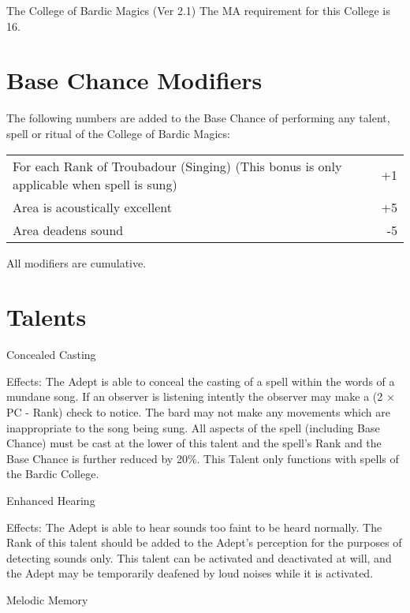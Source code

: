 \begin{Chapter}{The College of Bardic Magics (Ver 2.1)}
The MA requirement for this College is 16. 

\section{Base Chance Modifiers}

The following numbers are added to the Base Chance of performing any
talent, spell or ritual of the College of Bardic Magics:

\begin{tabularx}{\columnwidth}{Xr}
For each Rank of Troubadour (Singing) (This bonus is only applicable when spell is sung)	& +1 \\
Area is acoustically excellent	& +5 \\
Area deadens sound		& -5 \\
\end{tabularx}

All modifiers are cumulative. 

\section{Talents}

\begin{talent}[T-1]{Concealed Casting }

Effects:
The Adept is able to conceal the casting of a spell within the words
of a mundane song.  If an observer is listening intently the observer
may make a (2 × PC - Rank) check to notice. The bard may not make any
movements which are inappropriate to the song being sung.  All aspects
of the spell (including Base Chance) must be cast at the lower of this
talent and the spell’s Rank and the Base Chance is further reduced by
20\%. This Talent only functions with spells of the Bardic College.
\end{talent}

\begin{talent}[T-2]{Enhanced Hearing }

Effects: The Adept is able to hear sounds too faint 
to  be  heard  normally.  The  Rank  of  this  talent 
should  be  added  to  the  Adept’s  perception  for  the 
purposes  of  detecting  sounds  only.  This talent  can 
be activated and deactivated at will, and the Adept 
may be temporarily deafened by loud noises while 
it is activated. 
\end{talent}


\begin{talent}[T-3]{Melodic Memory }


\end{talent}
\end{Chapter}
